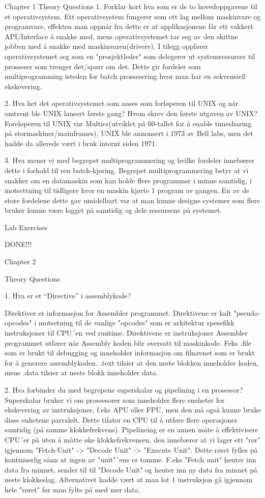Chapter 1
Theory Questions
1. Forklar kort hva som er de to hovedoppgavene til et operativsystem.
	Ett operativsystem fungerer som ett lag mellom maskinvare og programvare, effekten man oppnår fra dette er at applikasjonene får ett vakkert API/Interface å snakke med, mens operativsystemet tar seg av den skittne jobben med å snakke med maskinvaren(drivere). I tilegg oppfører operativsystemet seg som en "prosjektleder" som delegerer ut systemressurser til prosseser som trenger det/spørr om det. Dette gir fordeler som multiprogramming isteden for batch prossesering hvor man har en sekvensiell ekskevering.

2. Hva het det operativsystemet som anses som forløperen til UNIX og når omtrent ble UNIX lansert første gang? Hvem skrev den første utgaven av UNIX?
	Foreløperen til UNIX var Multics(utviklet på 60-tallet for å enable timesharing på stormaskiner/mainframes), UNIX ble annonsert i 1973 av Bell labs, men det hadde da allerede vært i bruk internt siden 1971.

3. Hva mener vi med begrepet multiprogrammering og hvilke fordeler innebærer dette i forhold til ren batch-kjøring.
	Begrepet multiprogrammering betyr at vi snakker om en datamaskin som kan holde flere programmer i minne samtidig, i motsettning til tidligere hvor en maskin kjørte 1 program av gangen. En av de store fordelene dette gav umidelbart var at man kunne designe systemer som flere bruker kunne være logget på samtidig og dele ressursene på systemet. 

Lab Exercises

DONE!!!

Chapter 2

Theory Questions

1. Hva er et “Directive” i assemblykode?

Direktiver er informasjon for Assembler programmet. Direktivene er kalt "pseudo-opcodes" i motsetning til de vanlige "opcodes" som er arkitektur spesefikk instruksjoner til CPU´en ved runtime. Direktivene er instruksjoner Assembler programmet utfører når Assembly koden blir oversatt til maskinkode. Feks .file som er brukt til debugging og inneholder informasjon om filnavnet som er brukt for å generere assemblykoden. .text tilsier at den neste blokken inneholder koden, mens .data tilsier at neste blokk inneholder data.

2. Hva forbinder du med begrepene superskalar og pipelining i en prosessor?
Superskalar bruker vi om prossesorer som inneholder flere eneheter for ekskevering av instruksjoner, f.eks APU eller FPU, men den må også kunne bruke disse enhetene parralelt. Dette tilater en CPU til å utføre flere operasjoner samtidig (på samme klokkefrekvens). Pipelineing er en annen måte å effektivisere CPU´er på uten å måtte øke klokkefrekvensen, den innebærer at vi lager ett "rør" igjennom "Fetch-Unit" -> "Decode Unit" -> "Execute Unit". Dette røret fylles på kontinuerlig sånn at ingen av "unit"´ene er tomme. F.eks "Fetch unit" henter inn data fra minnet, sender til til "Decode Unit" og henter inn ny data fra minnet på neste klokkeslag. Alternativet hadde vært at man lot 1 instruksjon gå igjennom hele "røret" før man fylte på med mer data. 

